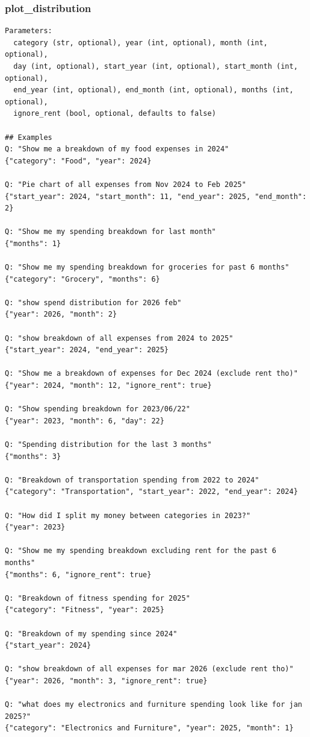 \documentclass[11pt,twocolumn]{article}
\begin{document}
\subsubsection{plot\_distribution}
\begin{scriptsize}
\begin{verbatim}
Parameters:
  category (str, optional), year (int, optional), month (int, optional),
  day (int, optional), start_year (int, optional), start_month (int, optional),
  end_year (int, optional), end_month (int, optional), months (int, optional),
  ignore_rent (bool, optional, defaults to false)

## Examples
Q: "Show me a breakdown of my food expenses in 2024"
{"category": "Food", "year": 2024}

Q: "Pie chart of all expenses from Nov 2024 to Feb 2025"
{"start_year": 2024, "start_month": 11, "end_year": 2025, "end_month": 2}

Q: "Show me my spending breakdown for last month"
{"months": 1}

Q: "Show me my spending breakdown for groceries for past 6 months"
{"category": "Grocery", "months": 6}

Q: "show spend distribution for 2026 feb"
{"year": 2026, "month": 2}

Q: "show breakdown of all expenses from 2024 to 2025"
{"start_year": 2024, "end_year": 2025}

Q: "Show me a breakdown of expenses for Dec 2024 (exclude rent tho)"
{"year": 2024, "month": 12, "ignore_rent": true}

Q: "Show spending breakdown for 2023/06/22"
{"year": 2023, "month": 6, "day": 22}

Q: "Spending distribution for the last 3 months"
{"months": 3}

Q: "Breakdown of transportation spending from 2022 to 2024"
{"category": "Transportation", "start_year": 2022, "end_year": 2024}

Q: "How did I split my money between categories in 2023?"
{"year": 2023}

Q: "Show me my spending breakdown excluding rent for the past 6 months"
{"months": 6, "ignore_rent": true}

Q: "Breakdown of fitness spending for 2025"
{"category": "Fitness", "year": 2025}

Q: "Breakdown of my spending since 2024"
{"start_year": 2024}

Q: "show breakdown of all expenses for mar 2026 (exclude rent tho)"
{"year": 2026, "month": 3, "ignore_rent": true}

Q: "what does my electronics and furniture spending look like for jan 2025?"
{"category": "Electronics and Furniture", "year": 2025, "month": 1}
\end{verbatim}
\end{scriptsize}
\end{document}
